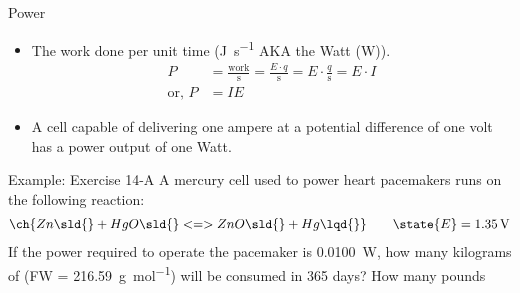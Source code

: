 \documentclass[notes=show]{beamer}
\begin{document}

\begin{frame}{Power}
	\begin{itemize}
		\item The work done per unit time (\si{\joule\per\second} AKA
			the Watt (\si{\watt})).
			\begin{align*}
				P &= \frac{\text{work}}{\si{\second}} = \frac{E
				\cdot q}{\si{\second}} = E \cdot
				\frac{q}{\si{\second}} = E \cdot I \\
				\text{or,~} P &= IE
			\end{align*}
		\item A cell capable of delivering one ampere at a potential
			difference of one volt has a power output of one Watt.
	\end{itemize}
\end{frame}


\begin{frame}[t]{Example: Exercise 14-A}
	A mercury cell used to power heart pacemakers runs on the following
	reaction:
	\begin{align*}
		\ch{Zn\sld{} + HgO\sld{} <=> ZnO\sld{} + Hg\lqd{}} \qquad
		\state{E} = \SI{1.35}{\volt}
	\end{align*}
	If the power required to operate the pacemaker is \SI{0.0100}{\watt},
	how many kilograms of  (FW = \SI{216.59}{\gram\per\mole}) will
	be consumed in 365 days? How many pounds 
\end{frame}

\end{document}
